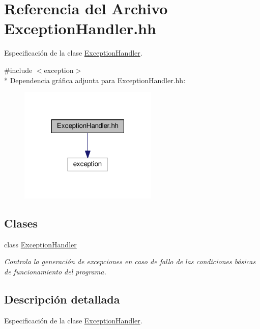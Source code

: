 \hypertarget{_exception_handler_8hh}{}\section{Referencia del Archivo Exception\+Handler.\+hh}
\label{_exception_handler_8hh}


Especificación de la clase \hyperlink{class_exception_handler}{Exception\+Handler}.  


{\ttfamily \#include $<$exception$>$}\\*
Dependencia gráfica adjunta para Exception\+Handler.\+hh\+:
\nopagebreak
\begin{figure}[H]
\begin{center}
\leavevmode
\includegraphics[width=187pt]{_exception_handler_8hh__incl}
\end{center}
\end{figure}
\subsection*{Clases}
\begin{DoxyCompactItemize}
\item 
class \hyperlink{class_exception_handler}{Exception\+Handler}
\begin{DoxyCompactList}\small\item\em Controla la generación de excepciones en caso de fallo de las condiciones básicas de funcionamiento del programa. \end{DoxyCompactList}\end{DoxyCompactItemize}


\subsection{Descripción detallada}
Especificación de la clase \hyperlink{class_exception_handler}{Exception\+Handler}. 


